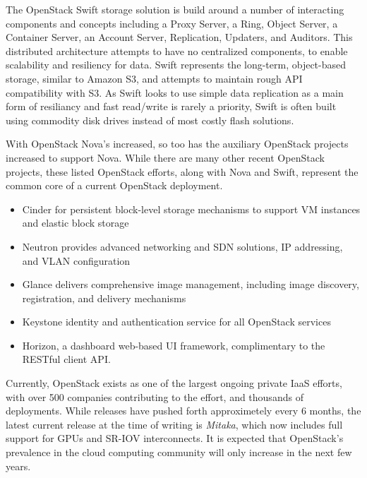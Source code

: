 The OpenStack Swift storage solution is build around a number of interacting components and concepts including a Proxy Server, a Ring, Object Server, a Container Server, an Account Server, Replication, Updaters, and Auditors. This distributed architecture attempts to have no centralized components, to enable scalability and resiliency for data.  Swift represents the long-term, object-based storage, similar to Amazon S3, and attempts to maintain rough API compatibility with S3. As Swift looks to use simple data replication as a main form of resiliancy and fast read/write is rarely a priority, Swift is often built using commodity disk drives instead of most costly flash solutions.  

With OpenStack Nova's increased, so too has the auxiliary OpenStack projects increased to support Nova.  While there are many other recent OpenStack projects, these listed OpenStack efforts, along with Nova and Swift, represent the common core of a current OpenStack deployment. 
 

\begin{itemize}
\item Cinder for persistent block-level storage mechanisms to support VM instances and elastic block storage
\item Neutron provides advanced networking and SDN solutions, IP addressing, and VLAN configuration
\item Glance delivers comprehensive image management, including image discovery, registration, and delivery mechanisms 
\item Keystone identity and authentication service for all OpenStack services
\item Horizon, a dashboard web-based UI framework, complimentary to the RESTful client API.   
\end{itemize}

Currently, OpenStack exists as one of the largest ongoing private IaaS efforts, with over 500 companies contributing to the effort, and thousands of deployments. While releases have pushed forth approximetely every 6 months, the latest current release at the time of writing is \emph{Mitaka}, which now includes full support for GPUs and SR-IOV interconnects. It is expected that OpenStack's prevalence in the cloud computing community will only increase in the next few years.   



